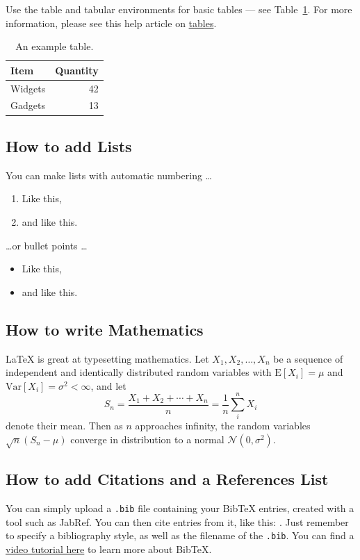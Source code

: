 \documentclass{article}
\begin{document}
Use the table and tabular environments for basic tables --- see Table~\ref{tab:widgets}.
For more information, please see this help article on \href{https://www.overleaf.com/learn/latex/tables}{tables}.

\begin{table}[tb]
\centering
\begin{tabular}{l|r}
Item & Quantity \\\hline
Widgets & 42 \\
Gadgets & 13
\end{tabular}
\caption{\label{tab:widgets}An example table.}
\end{table}


\subsection{How to add Lists}

You can make lists with automatic numbering \dots

\begin{enumerate}
\item Like this,
\item and like this.
\end{enumerate}
\dots or bullet points \dots
\begin{itemize}
\item Like this,
\item and like this.
\end{itemize}

\subsection{How to write Mathematics}

\LaTeX{} is great at typesetting mathematics. Let $X_1, X_2, \ldots, X_n$ be a sequence of independent and identically distributed random variables with $\text{E}[X_i] = \mu$ and $\text{Var}[X_i] = \sigma^2 < \infty$, and let
\[S_n = \frac{X_1 + X_2 + \cdots + X_n}{n}
      = \frac{1}{n}\sum_{i}^{n} X_i\]
denote their mean. Then as $n$ approaches infinity, the random variables $\sqrt{n}(S_n - \mu)$ converge in distribution to a normal $\mathcal{N}(0, \sigma^2)$.


\subsection{How to add Citations and a References List}

You can simply upload a \verb|.bib| file containing your BibTeX entries, created with a tool such as JabRef. You can then cite entries from it, like this: \cite{greenwade93}. Just remember to specify a bibliography style, as well as the filename of the \verb|.bib|. You can find a \href{https://www.overleaf.com/help/97-how-to-include-a-bibliography-using-bibtex}{video tutorial here} to learn more about BibTeX.




\end{document}
